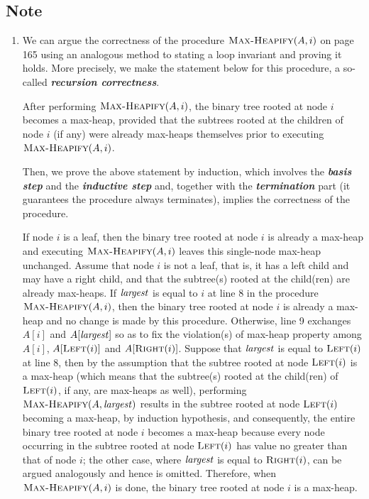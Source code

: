 \subsection*{Note}
\begin{enumerate}
%
\item We can argue the correctness of the procedure $\textnormal{\scshape Max-Heapify}(A, i)$ on page 165 using an analogous method to stating a loop invariant and proving it holds. More precisely, we make the statement below for this procedure, a so-called \textbf{\textit{recursion correctness}}.
\begin{recurcorr}
After performing $\textnormal{\scshape Max-Heapify}(A, i)$, the binary tree rooted at node $i$ becomes a max-heap, provided that the subtrees rooted at the children of node $i$ (if any) were already max-heaps themselves prior to executing $\textnormal{\scshape Max-Heapify}(A, i)$.
\end{recurcorr}
Then, we prove the above statement by induction, which involves the \textbf{\textit{basis step}} and the \textbf{\textit{inductive step}} and, together with the \textbf{\textit{termination}} part (it guarantees the procedure always terminates), implies the correctness of the procedure.
\begin{proofinduct}
%
\Basis If node $i$ is a leaf, then the binary tree rooted at node $i$ is already a max-heap and executing $\textnormal{\scshape Max-Heapify}(A, i)$ leaves this single-node max-heap unchanged.
%
\Induct Assume that node $i$ is not a leaf, that is, it has a left child and may have a right child, and that the subtree(s) rooted at the child(ren) are already max-heaps. If $\id{largest}$ is equal to $i$ at line 8 in the procedure $\textnormal{\scshape Max-Heapify}(A, i)$, then the binary tree rooted at node $i$ is already a max-heap and no change is made by this procedure. Otherwise, line 9 exchanges $A[i]$ and $A[\id{largest}]$ so as to fix the violation(s) of max-heap property among $A[i]$, $A[\textnormal{\scshape Left}(i)]$ and $A[\textnormal{\scshape Right}(i)]$. Suppose that $\id{largest}$ is equal to $\textnormal{\scshape Left}(i)$ at line 8, then by the assumption that the subtree rooted at node $\textnormal{\scshape Left}(i)$ is a max-heap (which means that the subtree(s) rooted at the child(ren) of $\textnormal{\scshape Left}(i)$, if any, are max-heaps as well), performing $\proc{Max-Heapify}(A, \id{largest})$ results in the subtree rooted at node $\textnormal{\scshape Left}(i)$ becoming a max-heap, by induction hypothesis, and consequently, the entire binary tree rooted at node $i$ becomes a max-heap because every node occurring in the subtree rooted at node $\textnormal{\scshape Left}(i)$ has value no greater than that of node $i$; the other case, where $\id{largest}$ is equal to $\textnormal{\scshape Right}(i)$, can be argued analogously and hence is omitted. Therefore, when $\textnormal{\scshape Max-Heapify}(A, i)$ is done, the binary tree rooted at node $i$ is a max-heap.

\end{proofinduct}
\end{enumerate}
